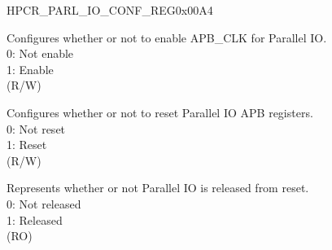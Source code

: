 \begin{register}{H}{PCR\_PARL\_IO\_CONF\_REG}{0x00A4}\label{regdesc:PCRPARLIOCONFREG}
%
%
%
%
\regnewline%
\begin{regdesc}\begin{reglist}
\label{fielddesc:PCRPARLCLKEN}\item [PCR\_PARL\_CLK\_EN] Configures whether or not to enable APB\_CLK for Parallel IO. \\
0: Not enable\\
1: Enable\\ (R/W)
\label{fielddesc:PCRPARLRSTEN}\item [PCR\_PARL\_RST\_EN] Configures whether or not to reset Parallel IO APB registers.\\
0: Not reset\\ 
1: Reset\\
(R/W)
\label{fielddesc:PCRPARLREADY}\item [PCR\_PARL\_READY] Represents whether or not Parallel IO is released from reset.\\
0: Not released\\
1: Released\\ (RO)
\end{reglist}\end{regdesc}
\end{register}



